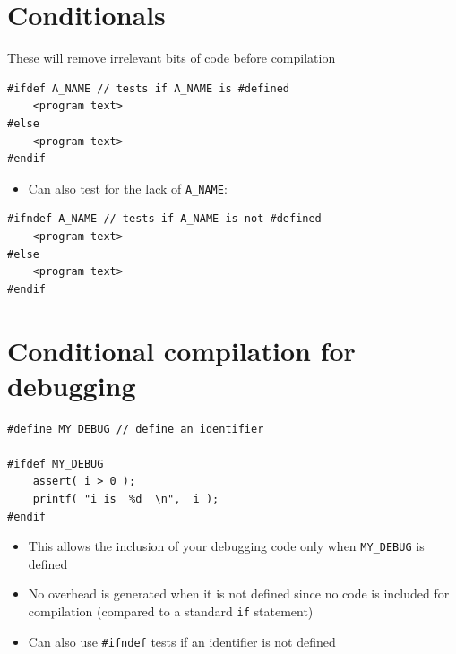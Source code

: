 \documentclass{article}
\begin{document}
\section{Conditionals}
These will remove irrelevant bits of code before compilation
\begin{verbatim}
#ifdef A_NAME // tests if A_NAME is #defined
	<program text>		
#else
	<program text>
#endif
\end{verbatim}

\begin{itemize}
\item Can also test for the lack of \verb!A_NAME!:
\end{itemize}

\begin{verbatim}
#ifndef A_NAME // tests if A_NAME is not #defined
	<program text>		
#else
	<program text>
#endif
\end{verbatim}



\section{Conditional compilation for debugging}
\begin{verbatim}
#define MY_DEBUG // define an identifier

#ifdef MY_DEBUG
	assert( i > 0 );
	printf( "i is  %d  \n",  i );
#endif
\end{verbatim}

\begin{itemize}
\item This allows the inclusion of your debugging code only when \verb!MY_DEBUG! is defined
\item No overhead is generated when it is not defined since no code is included for compilation (compared to a standard \verb!if! statement)
\item Can also use \verb!#ifndef! tests if an identifier is not defined
\end{itemize}
\end{document}
